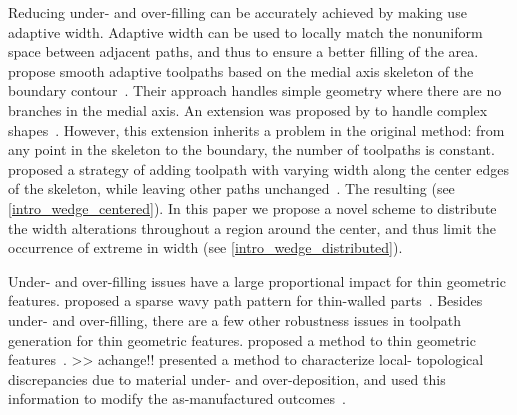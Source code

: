 Reducing under- and over-filling can be accurately achieved by making use  adaptive  width.
Adaptive width can be used to locally match the nonuniform space between adjacent paths, and thus to ensure a better filling of the area.
\citeauthor{kao1998optimal} propose smooth adaptive toolpaths based on the medial axis skeleton of the boundary contour~\cite{kao1998optimal}.
Their approach handles simple geometry where there are no branches in the medial axis.
An extension was proposed by \citeauthor{Ding2016a} to handle complex shapes~\cite{Ding2016a}.
However, this extension inherits a problem in the original method:
from any point in the skeleton to the boundary, the number of toolpaths is constant.
\citeauthor{Jin2017JMS} proposed a strategy of adding toolpath with varying width along the center edges of the skeleton, while leaving other paths unchanged~\cite{Jin2017JMS}.
The resulting  (see \cref{intro_wedge_centered}).
In this paper we propose a novel scheme to distribute the width alterations throughout a region around the center, and thus limit the occurrence of extreme  in width (see \cref{intro_wedge_distributed}).

Under- and over-filling issues have a large proportional impact for thin geometric features.
\citeauthor{Jin2017a} proposed a sparse wavy path pattern for thin-walled parts~\cite{Jin2017a}.
Besides under- and over-filling, there are a few other robustness issues in toolpath generation for thin geometric features.
\citeauthor{Moesen2011} proposed a method to  thin geometric features~\cite{Moesen2011}.
>> achange!!
\citeauthor{Behandish2019a} presented a method to characterize local- topological discrepancies due to material under- and over-deposition, and used this information to modify the as-manufactured outcomes~\cite{Behandish2019a}. 

